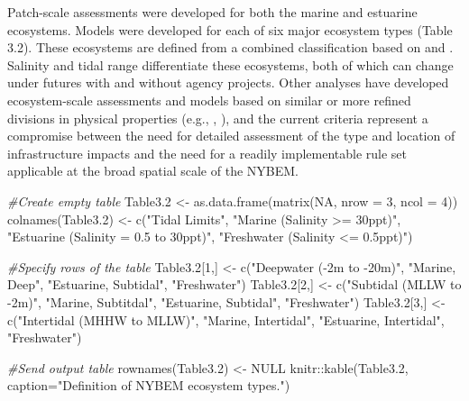 \documentclass[
]{book}
\newenvironment{Shaded}{\begin{snugshade}}{\end{snugshade}}
\newcommand{\AttributeTok}[1]{\textcolor[rgb]{0.77,0.63,0.00}{#1}}
\newcommand{\CommentTok}[1]{\textcolor[rgb]{0.56,0.35,0.01}{\textit{#1}}}
\newcommand{\ConstantTok}[1]{\textcolor[rgb]{0.00,0.00,0.00}{#1}}
\newcommand{\DecValTok}[1]{\textcolor[rgb]{0.00,0.00,0.81}{#1}}
\newcommand{\FloatTok}[1]{\textcolor[rgb]{0.00,0.00,0.81}{#1}}
\newcommand{\FunctionTok}[1]{\textcolor[rgb]{0.00,0.00,0.00}{#1}}
\newcommand{\NormalTok}[1]{#1}
\newcommand{\OtherTok}[1]{\textcolor[rgb]{0.56,0.35,0.01}{#1}}
\newcommand{\SpecialCharTok}[1]{\textcolor[rgb]{0.00,0.00,0.00}{#1}}
\newcommand{\StringTok}[1]{\textcolor[rgb]{0.31,0.60,0.02}{#1}}
\begin{document}
Patch-scale assessments were developed for both the marine and estuarine ecosystems. Models were developed for each of six major ecosystem types (Table 3.2). These ecosystems are defined from a combined classification based on \citet{cowardin_classification_1979} and \citet{us_fish_and_wildlife_service_usfws_significant_1997}. Salinity and tidal range differentiate these ecosystems, both of which can change under futures with and without agency projects. Other analyses have developed ecosystem-scale assessments and models based on similar or more refined divisions in physical properties (e.g., \citet{clough_modeling_2016}, \citet{fischbach_building_2018}), and the current criteria represent a compromise between the need for detailed assessment of the type and location of infrastructure impacts and the need for a readily implementable rule set applicable at the broad spatial scale of the NYBEM.

\begin{Shaded}
\begin{Highlighting}[]
\CommentTok{\#Create empty table}
\NormalTok{Table3}\FloatTok{.2} \OtherTok{\textless{}{-}} \FunctionTok{as.data.frame}\NormalTok{(}\FunctionTok{matrix}\NormalTok{(}\ConstantTok{NA}\NormalTok{, }\AttributeTok{nrow =} \DecValTok{3}\NormalTok{, }\AttributeTok{ncol =} \DecValTok{4}\NormalTok{))}
\FunctionTok{colnames}\NormalTok{(Table3}\FloatTok{.2}\NormalTok{) }\OtherTok{\textless{}{-}} \FunctionTok{c}\NormalTok{(}\StringTok{"Tidal Limits"}\NormalTok{, }\StringTok{"Marine (Salinity \textgreater{}= 30ppt)"}\NormalTok{, }\StringTok{"Estuarine (Salinity = 0.5 to 30ppt)"}\NormalTok{, }\StringTok{"Freshwater (Salinity \textless{}= 0.5ppt)"}\NormalTok{)}

\CommentTok{\#Specify rows of the table}
\NormalTok{Table3}\FloatTok{.2}\NormalTok{[}\DecValTok{1}\NormalTok{,] }\OtherTok{\textless{}{-}} \FunctionTok{c}\NormalTok{(}\StringTok{"Deepwater ({-}2m to {-}20m)"}\NormalTok{, }\StringTok{"Marine, Deep"}\NormalTok{, }\StringTok{"Estuarine, Subtidal"}\NormalTok{, }\StringTok{"Freshwater"}\NormalTok{)}
\NormalTok{Table3}\FloatTok{.2}\NormalTok{[}\DecValTok{2}\NormalTok{,] }\OtherTok{\textless{}{-}} \FunctionTok{c}\NormalTok{(}\StringTok{"Subtidal (MLLW to {-}2m)"}\NormalTok{, }\StringTok{"Marine, Subtitdal"}\NormalTok{, }\StringTok{"Estuarine, Subtidal"}\NormalTok{, }\StringTok{"Freshwater"}\NormalTok{)}
\NormalTok{Table3}\FloatTok{.2}\NormalTok{[}\DecValTok{3}\NormalTok{,] }\OtherTok{\textless{}{-}} \FunctionTok{c}\NormalTok{(}\StringTok{"Intertidal (MHHW to MLLW)"}\NormalTok{, }\StringTok{"Marine, Intertidal"}\NormalTok{, }\StringTok{"Estuarine, Intertidal"}\NormalTok{, }\StringTok{"Freshwater"}\NormalTok{)}

\CommentTok{\#Send output table}
\FunctionTok{rownames}\NormalTok{(Table3}\FloatTok{.2}\NormalTok{) }\OtherTok{\textless{}{-}} \ConstantTok{NULL}
\NormalTok{knitr}\SpecialCharTok{::}\FunctionTok{kable}\NormalTok{(Table3}\FloatTok{.2}\NormalTok{, }\AttributeTok{caption=}\StringTok{"Definition of NYBEM ecosystem types."}\NormalTok{) }
\end{Highlighting}
\end{Shaded}
\end{document}
